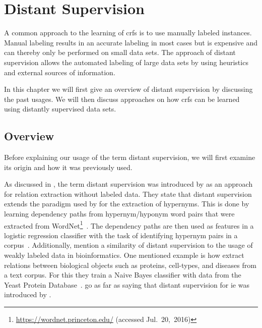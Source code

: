 \chapter{Distant Supervision}\label{cha:distant-supervision}

A common approach to the learning of \glspl{crf} is to use manually labeled instances.
Manual labeling results in an accurate labeling in most cases but is expensive and can thereby only be performed on small data sets.
The approach of \gls{distant supervision} allows the automated labeling of large data sets by using heuristics and external sources of information.

In this chapter we will first give an overview of \gls{distant supervision} by discussing the past usages.
We will then discuss approaches on how \glspl{crf} can be learned using distantly supervised data sets.

\section{Overview}

Before explaining our usage of the term \gls{distant supervision}, we will first examine its origin and how it was previously used.

\bigskip

As discussed in , the term \gls{distant supervision} was introduced by \citet{mintz2009distant} as an approach for relation extraction without labeled data.
They state that \gls{distant supervision} extends the paradigm used by \citet{snow2005learning} for the extraction of hypernyms.
This is done by learning dependency paths from hypernym/hyponym word pairs that were extracted from WordNet\footnote{\url{https://wordnet.princeton.edu/} (accessed Jul.~20,~2016)}~\citep{snow2005learning}.
The dependency paths are then used as features in a logistic regression classifier with the task of identifying hypernym pairs in a corpus~\citep{snow2005learning}.
Additionally, \citet{mintz2009distant} mention a similarity of \gls{distant supervision} to the usage of weakly labeled data in bioinformatics.
One mentioned example is how \citet{craven1999constructing} extract relations between biological objects such as proteins, cell-types, and diseases from a text corpus.
For this they train a Naive Bayes classifier with data from the Yeast Protein Database~\citep{payne1997yeast}.
\citet{surdeanu2012multi} go as far as saying that distant supervision for \gls{ie} was introduced by \citet{craven1999constructing}.


